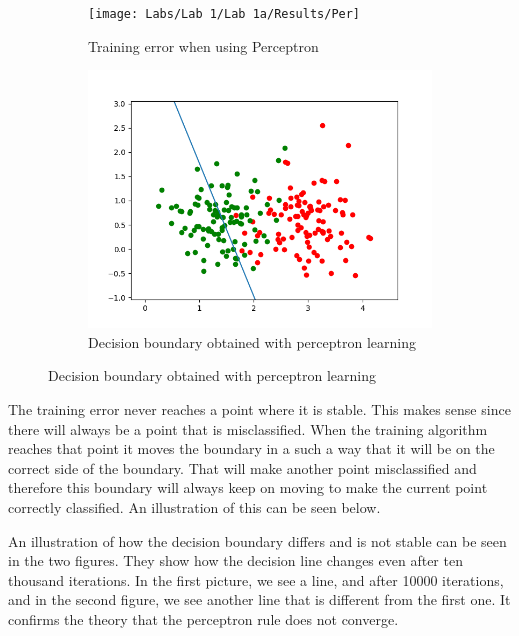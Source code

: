 \documentclass[a4paper]{article}
\begin{document}
\begin{figure}[htb]
    \centering
    \begin{subfigure}{0.4\textwidth}
         \texttt{[image: Labs/Lab 1/Lab 1a/Results/Per]}
        \caption{Training error when using Perceptron}
        \label{fig:Perceptron-training-error}
    \end{subfigure}
    \hfill
    \begin{subfigure}{0.4\textwidth}
        \includegraphics[width=\textwidth]{Labs/Lab 1/Lab 1a/Results/perceptron-decision-boundary-not-separable.png}
        \caption{Decision boundary obtained with perceptron learning}
        \label{fig:decision-boundary}
    \end{subfigure}
\end{figure}

The training error never reaches a point where it is stable. This makes sense since there will always be a point that is misclassified. When the training algorithm reaches that point it moves the boundary in a such a way that it will be on the correct side of the boundary. That will make another point misclassified and therefore this boundary will always keep on moving to make the current point correctly classified. An illustration of this can be seen below.

An illustration of how the decision boundary differs and is not stable can be seen in the two figures. They show how the decision line changes even after ten thousand iterations. In the first picture, we see a line, and after 10000 iterations, and in the second figure, we see another line that is different from the first one. It confirms the theory that the perceptron rule does not converge.   
\end{document}
